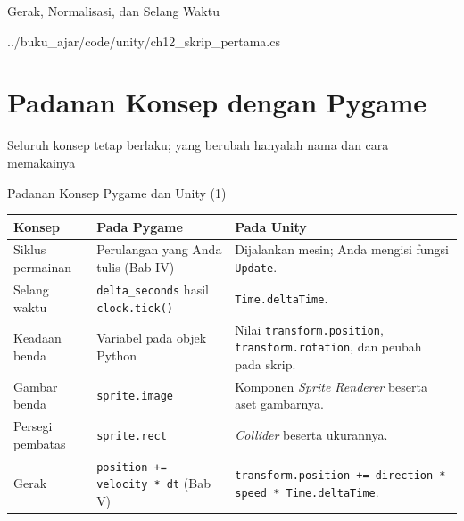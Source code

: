 \documentclass[aspectratio=169,10pt]{beamer}
\begin{document}
\begin{frame}[fragile]{Gerak, Normalisasi, dan Selang Waktu}

  {../buku_ajar/code/unity/ch12_skrip_pertama.cs}
\end{frame}

\section{Padanan Konsep dengan Pygame}
  {Seluruh konsep tetap berlaku; yang berubah hanyalah nama dan cara memakainya}

\begin{frame}{Padanan Konsep Pygame dan Unity (1)}
{\scriptsize
\renewcommand{\arraystretch}{1.06}
\begin{tabularx}{\textwidth}{@{}>{\raggedright\arraybackslash}p{3.0cm}
    >{\raggedright\arraybackslash}p{4.4cm}
    >{\raggedright\arraybackslash}X@{}}
\toprule
\textbf{Konsep} & \textbf{Pada Pygame} & \textbf{Pada Unity} \\
\midrule
Siklus permainan & Perulangan yang Anda tulis (Bab IV) &
  Dijalankan mesin; Anda mengisi fungsi \texttt{Update}. \\
\addlinespace
Selang waktu & \texttt{delta\_seconds} hasil \texttt{clock.tick()} &
  \texttt{Time.deltaTime}. \\
\addlinespace
Keadaan benda & Variabel pada objek Python &
  Nilai \texttt{transform.position}, \texttt{transform.rotation}, dan peubah
  pada skrip. \\
\addlinespace
Gambar benda & \texttt{sprite.image} &
  Komponen \emph{Sprite Renderer} beserta aset gambarnya. \\
\addlinespace
Persegi pembatas & \texttt{sprite.rect} &
  \emph{Collider} beserta ukurannya. \\
\addlinespace
Gerak & \texttt{position += velocity * dt} (Bab V) &
  \texttt{transform.position += direction * speed * Time.deltaTime}. \\
\bottomrule
\end{tabularx}}
\end{frame}
\end{document}
